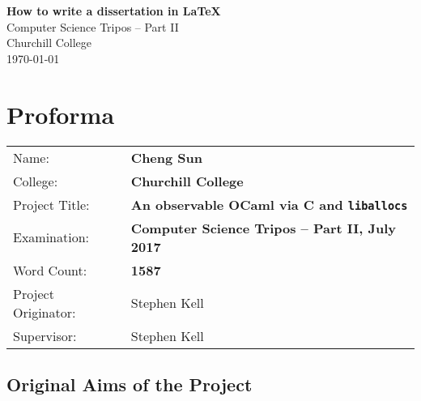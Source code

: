 \documentclass[12pt,a4paper,twoside,openright]{report}
\begin{document}





\pagestyle{empty}


\vspace*{60mm}
\begin{center}
\Huge
\textbf{How to write a dissertation in \LaTeX} \\[5mm]
Computer Science Tripos -- Part II \\[5mm]
Churchill College \\[5mm]
\today  %
\end{center}


\pagestyle{plain}

\chapter*{Proforma}

{\large
\begin{tabular}{ll}
Name:               & \bf Cheng Sun                       \\
College:            & \bf Churchill College                     \\
Project Title:      & \bf An observable OCaml via C and \lstinline!liballocs! \\
Examination:        & \bf Computer Science Tripos -- Part II, July 2017  \\
Word Count:         & \bf 1587\footnotemark[1] \\
Project Originator: & Stephen Kell                    \\
Supervisor:         & Stephen Kell                    \\
\end{tabular}
}


\section*{Original Aims of the Project}

\end{document}
